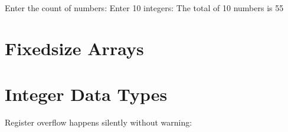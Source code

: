 \documentclass[letterpaper,10pt,english,openany,oneside]{sphinxmanual}
\begin{document}
\begin{sphinxVerbatim}[commandchars=\\\{\}]
Enter the count of numbers:
Enter 10 integers:
The total of 10 numbers is 55
\end{sphinxVerbatim}


\section{Fixed\sphinxhyphen{}size Arrays}
\label{\detokenize{constructs-week01:fixed-size-arrays}}
\begin{sphinxVerbatim}[commandchars=\\\{\}]
    
    
 \PYG{p}{[}\PYG{p}{]}\PYG{p}{[}\PYG{p}{]}   
                  
                  
\end{sphinxVerbatim}


\section{Integer Data Types}
\label{\detokenize{constructs-week01:integer-data-types}}
\sphinxAtStartPar
Register overflow happens silently without warning:
\end{document}

